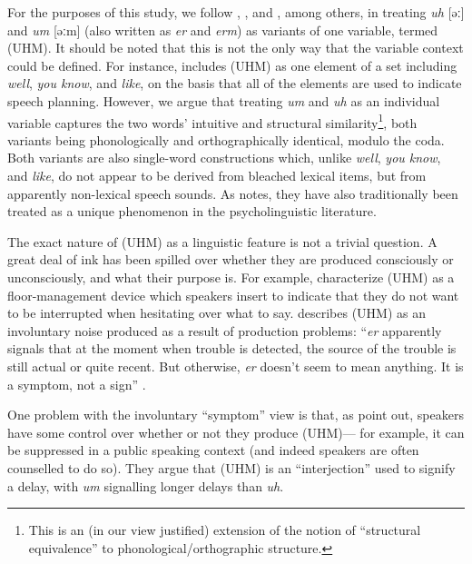 \documentclass[11pt]{article}
\begin{document}
For the purposes of this study, we follow \textcite{fruehwald2016},
\textcite{wielingetal2016}, and \textcite{tottie2016}, among others, in treating
\emph{uh} [əː] and \emph{um} [əːm] (also written as \emph{er} and \emph{erm}) as
variants of one variable, termed (UHM).
It should be noted that this is not the only way that the variable context could
be defined.
For instance, \textcite{tottie2018} includes (UHM) as one element of a set
including \emph{well}, \emph{you know}, and \emph{like}, on the basis that all
of the elements are used to indicate speech planning.
However, we argue that treating \emph{um} and \emph{uh} as an individual
variable captures the two words' intuitive and structural similarity\footnote{%
    This is an (in our view justified) extension of the notion of ``structural
    equivalence'' \parencite{pichler2010, tagliamontedenis2010} to
    phonological/orthographic structure.
}, both variants being phonologically and orthographically identical, modulo
the coda.
Both variants are also single-word constructions which, unlike \emph{well},
\emph{you know}, and \emph{like}, do not appear to be derived from bleached
lexical items, but from apparently non-lexical speech sounds.
As \textcite{fruehwald2016} notes, they have also traditionally been treated as
a unique phenomenon in the psycholinguistic literature.

The exact nature of (UHM) as a linguistic feature is not a trivial question.
A great deal of ink has been spilled over whether they are produced consciously
or unconsciously, and what their purpose is.
For example, \textcite[41--42]{maclayosgood1959} characterize (UHM) as a
floor-management device which speakers insert to indicate that they do not want
to be interrupted when hesitating over what to say.
\textcite{levelt1983, levelt1989} describes (UHM) as an involuntary noise
produced as a result of production problems: ``\emph{er} apparently signals that
at the moment when trouble is detected, the source of the trouble is still
actual or quite recent. But otherwise, \emph{er} doesn't seem to mean anything.
It is a symptom, not a sign'' \parencite[484]{levelt1989}.

One problem with the involuntary ``symptom'' view is that, as
\textcite{clarkfoxtree2002} point out, speakers have some control over whether
or not they produce (UHM)---%
for example, it can be suppressed in a public speaking context (and indeed
speakers are often counselled to do so).
They argue that (UHM) is an ``interjection'' used to signify a delay, with
\emph{um} signalling longer delays than \emph{uh}.
\end{document}
